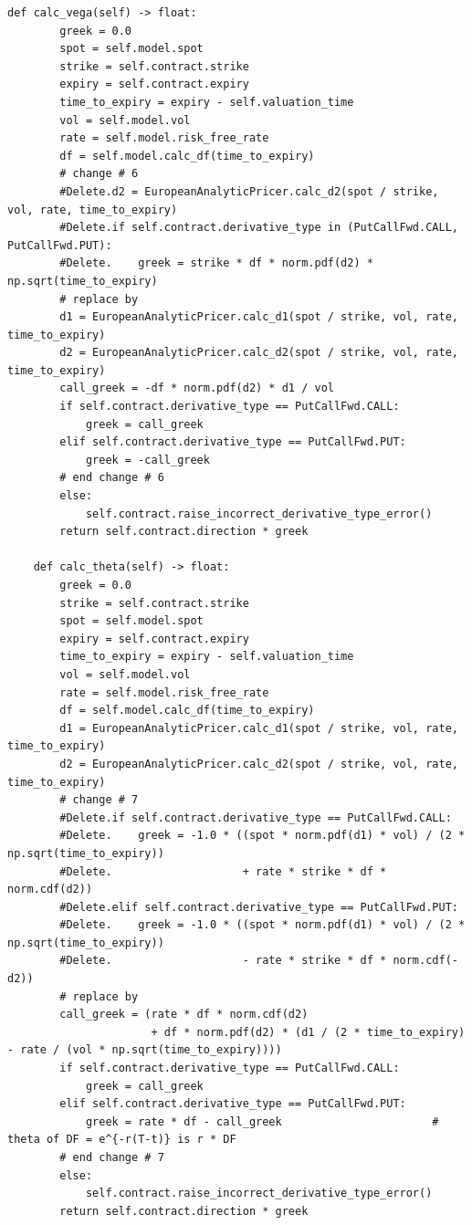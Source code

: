 \documentclass[11pt,a4paper]{article}
\begin{document}
\begin{lstlisting}[style=prof]
    def calc_vega(self) -> float:
        greek = 0.0
        spot = self.model.spot
        strike = self.contract.strike
        expiry = self.contract.expiry
        time_to_expiry = expiry - self.valuation_time
        vol = self.model.vol
        rate = self.model.risk_free_rate
        df = self.model.calc_df(time_to_expiry)
        # change # 6
        #Delete.d2 = EuropeanAnalyticPricer.calc_d2(spot / strike, vol, rate, time_to_expiry)
        #Delete.if self.contract.derivative_type in (PutCallFwd.CALL, PutCallFwd.PUT):
        #Delete.    greek = strike * df * norm.pdf(d2) * np.sqrt(time_to_expiry)
        # replace by
        d1 = EuropeanAnalyticPricer.calc_d1(spot / strike, vol, rate, time_to_expiry)
        d2 = EuropeanAnalyticPricer.calc_d2(spot / strike, vol, rate, time_to_expiry)
        call_greek = -df * norm.pdf(d2) * d1 / vol
        if self.contract.derivative_type == PutCallFwd.CALL:
            greek = call_greek
        elif self.contract.derivative_type == PutCallFwd.PUT:
            greek = -call_greek
        # end change # 6
        else:
            self.contract.raise_incorrect_derivative_type_error()
        return self.contract.direction * greek

    def calc_theta(self) -> float:
        greek = 0.0
        strike = self.contract.strike
        spot = self.model.spot
        expiry = self.contract.expiry
        time_to_expiry = expiry - self.valuation_time
        vol = self.model.vol
        rate = self.model.risk_free_rate
        df = self.model.calc_df(time_to_expiry)
        d1 = EuropeanAnalyticPricer.calc_d1(spot / strike, vol, rate, time_to_expiry)
        d2 = EuropeanAnalyticPricer.calc_d2(spot / strike, vol, rate, time_to_expiry)
        # change # 7
        #Delete.if self.contract.derivative_type == PutCallFwd.CALL:
        #Delete.    greek = -1.0 * ((spot * norm.pdf(d1) * vol) / (2 * np.sqrt(time_to_expiry))
        #Delete.                    + rate * strike * df * norm.cdf(d2))
        #Delete.elif self.contract.derivative_type == PutCallFwd.PUT:
        #Delete.    greek = -1.0 * ((spot * norm.pdf(d1) * vol) / (2 * np.sqrt(time_to_expiry))
        #Delete.                    - rate * strike * df * norm.cdf(-d2))
        # replace by
        call_greek = (rate * df * norm.cdf(d2)
                      + df * norm.pdf(d2) * (d1 / (2 * time_to_expiry) - rate / (vol * np.sqrt(time_to_expiry))))
        if self.contract.derivative_type == PutCallFwd.CALL:
            greek = call_greek
        elif self.contract.derivative_type == PutCallFwd.PUT:
            greek = rate * df - call_greek                       # theta of DF = e^{-r(T-t)} is r * DF
        # end change # 7
        else:
            self.contract.raise_incorrect_derivative_type_error()
        return self.contract.direction * greek


\end{lstlisting}
\end{document}
